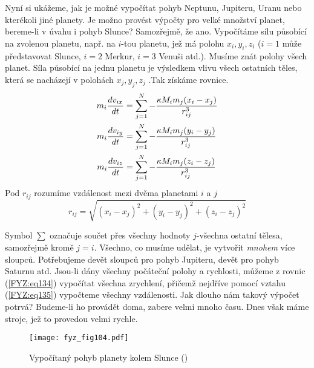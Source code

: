     Nyní si ukážeme, jak je možné vypočítat pohyb Neptunu, Jupiteru, Uranu nebo kterékoli jiné 
    planety. Je možno provést výpočty pro velké množství planet, bereme-li v úvahu i pohyb Slunce? 
    Samozřejmě, že ano. Vypočítáme sílu působící na zvolenou planetu, např. na \(i\)-tou planetu, 
    jež má polohu \(x_i, y_i, z_i\) (\(i = 1\) může představovat Slunce, \(i = 2\) Merkur, \(i = 
    3\) Venuši atd.). Musíme znát polohy všech planet. Síla působící na jednu planetu je výsledkem 
    vlivu všech ostatních těles, která se nacházejí v polohách \(x_j, y_j, z_j\) .Tak získáme 
    rovnice.
    \begin{subequations}
      \label{FYZ:eq134}
      \begin{align}
        m_i\dfrac{d v_{ix}}{d t} 
          &= \sum_{j=1}^N - \frac{\kappa M_im_j(x_i - x_j)}{r_{ij}^3}  \label{FYZ:eq134a}  \\
        m_i\dfrac{d v_{iy}}{d t} 
          &= \sum_{j=1}^N - \frac{\kappa M_im_j(y_i - y_j)}{r_{ij}^3}  \label{FYZ:eq134b}  \\
        m_i\dfrac{d v_{iz}}{d t} 
          &= \sum_{j=1}^N - \frac{\kappa M_im_j(z_i - z_j)}{r_{ij}^3}  \label{FYZ:eq134c}  
      \end{align}
    \end{subequations}
    Pod \(r_{ij}\) rozumíme vzdálenost mezi dvěma planetami \(i\) a \(j\)
    \begin{equation}\label{FYZ:eq135}
      r_{ij} = \sqrt{(x_i-x_j)^2 + (y_i-y_j)^2 + (z_i-z_j)^2}
    \end{equation}
    
    Symbol \(\sum\) označuje součet přes všechny hodnoty \(j\)-všechna ostatní tělesa, samozřejmě 
    kromě \(j = i\). Všechno, co musíme udělat, je vytvořit \emph{mnohem} více sloupců. Potřebujeme 
    devět sloupců pro pohyb Jupiteru, devět pro pohyb Saturnu atd. Jsou-li dány všechny počáteční 
    polohy a rychlosti, můžeme z rovnic (\ref{FYZ:eq134}) vypočítat všechna zrychlení, přičemž 
    nejdříve pomocí vztahu (\ref{FYZ:eq135}) vypočteme všechny vzdálenosti. Jak dlouho nám takový 
    výpočet potrvá? Budeme-li ho provádět doma, zabere velmi mnoho času. Dnes však máme stroje, jež 
    to provedou velmi rychle.
    
    \begin{figure}[ht!]  %
      \centering
      \texttt{[image: fyz\_fig104.pdf]}
      \caption{Vypočítaný pohyb planety kolem Slunce (\cite[s.~134]{Feynman01})}
      \label{fyz:fig104}
    \end{figure}
    
